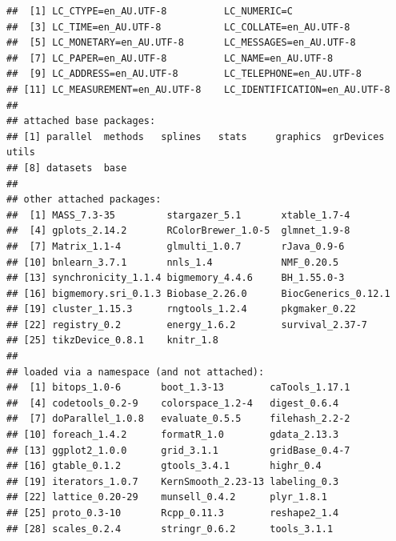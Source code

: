 \documentclass{article}\usepackage[]{graphicx}\usepackage[]{color}
\makeatletter
\newenvironment{kframe}{%
 \def\at@end@of@kframe{}%
 \ifinner\ifhmode%
  \def\at@end@of@kframe{\end{minipage}}%
  \begin{minipage}{\columnwidth}%
 \fi\fi%
 \def\FrameCommand##1{\hskip\@totalleftmargin \hskip-\fboxsep
 \colorbox{shadecolor}{##1}\hskip-\fboxsep
     \hskip-\linewidth \hskip-\@totalleftmargin \hskip\columnwidth}%
 \MakeFramed {\advance\hsize-\width
   \@totalleftmargin\z@ \linewidth\hsize
   \@setminipage}}%
 {\par\unskip\endMakeFramed%
 \at@end@of@kframe}
\newenvironment{knitrout}{}{} %
\makeatother
\begin{document}
\begin{knitrout}
\begin{kframe}
\begin{verbatim}
##  [1] LC_CTYPE=en_AU.UTF-8          LC_NUMERIC=C                 
##  [3] LC_TIME=en_AU.UTF-8           LC_COLLATE=en_AU.UTF-8       
##  [5] LC_MONETARY=en_AU.UTF-8       LC_MESSAGES=en_AU.UTF-8      
##  [7] LC_PAPER=en_AU.UTF-8          LC_NAME=en_AU.UTF-8          
##  [9] LC_ADDRESS=en_AU.UTF-8        LC_TELEPHONE=en_AU.UTF-8     
## [11] LC_MEASUREMENT=en_AU.UTF-8    LC_IDENTIFICATION=en_AU.UTF-8
## 
## attached base packages:
## [1] parallel  methods   splines   stats     graphics  grDevices utils    
## [8] datasets  base     
## 
## other attached packages:
##  [1] MASS_7.3-35         stargazer_5.1       xtable_1.7-4       
##  [4] gplots_2.14.2       RColorBrewer_1.0-5  glmnet_1.9-8       
##  [7] Matrix_1.1-4        glmulti_1.0.7       rJava_0.9-6        
## [10] bnlearn_3.7.1       nnls_1.4            NMF_0.20.5         
## [13] synchronicity_1.1.4 bigmemory_4.4.6     BH_1.55.0-3        
## [16] bigmemory.sri_0.1.3 Biobase_2.26.0      BiocGenerics_0.12.1
## [19] cluster_1.15.3      rngtools_1.2.4      pkgmaker_0.22      
## [22] registry_0.2        energy_1.6.2        survival_2.37-7    
## [25] tikzDevice_0.8.1    knitr_1.8          
## 
## loaded via a namespace (and not attached):
##  [1] bitops_1.0-6       boot_1.3-13        caTools_1.17.1    
##  [4] codetools_0.2-9    colorspace_1.2-4   digest_0.6.4      
##  [7] doParallel_1.0.8   evaluate_0.5.5     filehash_2.2-2    
## [10] foreach_1.4.2      formatR_1.0        gdata_2.13.3      
## [13] ggplot2_1.0.0      grid_3.1.1         gridBase_0.4-7    
## [16] gtable_0.1.2       gtools_3.4.1       highr_0.4         
## [19] iterators_1.0.7    KernSmooth_2.23-13 labeling_0.3      
## [22] lattice_0.20-29    munsell_0.4.2      plyr_1.8.1        
## [25] proto_0.3-10       Rcpp_0.11.3        reshape2_1.4      
## [28] scales_0.2.4       stringr_0.6.2      tools_3.1.1
\end{verbatim}
\end{kframe}
\end{knitrout}
\end{document}
